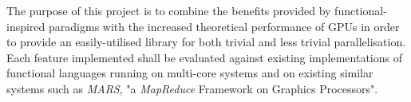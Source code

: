 The purpose of this project is to combine the benefits provided by functional-inspired paradigms with the increased theoretical performance of \ac{GPUs} in order to provide an easily-utilised library for both trivial and less trivial parallelisation.
Each feature implemented shall be evaluated against existing implementations of functional languages running on multi-core systems and on existing similar systems such as \emph{MARS}, "a \emph{MapReduce} Framework on Graphics Processors".
